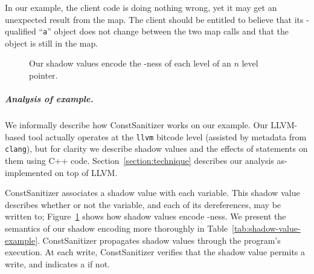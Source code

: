 In our example, the client code is doing nothing wrong, yet it may get an
unexpected result from the map.
The client should be entitled to believe that its \const{}-qualified
``\texttt{a}'' object does not change between the two map calls and that
the object is still in the map.

\begin{figure}[!htb]
  \centering
  \caption{Our shadow values encode the \const{}-ness of each level of an $n$
           level pointer.}
  \label{figure:shadow-values}
\end{figure}

\subparagraph*{Analysis of example.}
We informally describe how ConstSanitizer works on our example.
Our LLVM-based tool actually operates at the \texttt{llvm} bitcode
level (assisted by metadata from \texttt{clang}), but for clarity we describe
shadow values and the effects of statements on them using C++ code.
Section~\ref{section:technique} describes our analysis as-implemented on top of
LLVM.

ConstSanitizer associates a shadow value with each variable.
This shadow value describes whether or not the variable, and each of its
dereferences, may be written to; Figure~\ref{figure:shadow-values} shows how
shadow values encode \const{}-ness.
We present the semantics of our shadow encoding more thoroughly in
Table~\ref{tab:shadow-value-example}.
ConstSanitizer propagates shadow values through the program's execution.
At each write, ConstSanitizer verifies that the shadow value permits a write,
and indicates a \wtcq{} if not.

